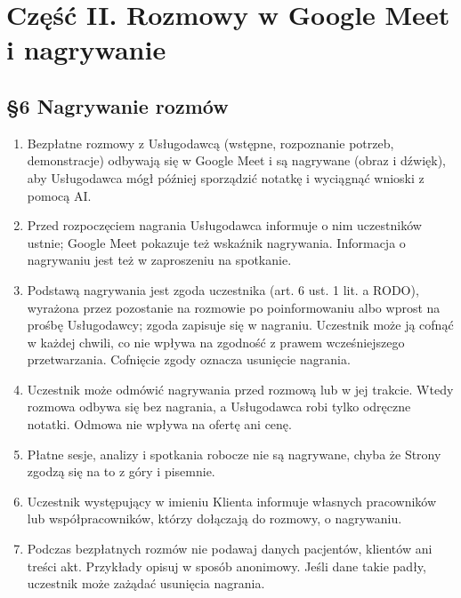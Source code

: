 \documentclass[11pt,a4paper]{article}
\begin{document}
\section*{Część II. Rozmowy w Google Meet i nagrywanie}

\subsection*{§6 Nagrywanie rozmów}
\begin{enumerate}
\item Bezpłatne rozmowy z Usługodawcą (wstępne, rozpoznanie potrzeb, demonstracje) odbywają się w Google Meet i są nagrywane (obraz i dźwięk), aby Usługodawca mógł później sporządzić notatkę i wyciągnąć wnioski z pomocą AI.
\item Przed rozpoczęciem nagrania Usługodawca informuje o nim uczestników ustnie; Google Meet pokazuje też wskaźnik nagrywania. Informacja o nagrywaniu jest też w zaproszeniu na spotkanie.
\item Podstawą nagrywania jest zgoda uczestnika (art. 6 ust. 1 lit. a RODO), wyrażona przez pozostanie na rozmowie po poinformowaniu albo wprost na prośbę Usługodawcy; zgoda zapisuje się w nagraniu. Uczestnik może ją cofnąć w każdej chwili, co nie wpływa na zgodność z prawem wcześniejszego przetwarzania. Cofnięcie zgody oznacza usunięcie nagrania.
\item Uczestnik może odmówić nagrywania przed rozmową lub w jej trakcie. Wtedy rozmowa odbywa się bez nagrania, a Usługodawca robi tylko odręczne notatki. Odmowa nie wpływa na ofertę ani cenę.
\item Płatne sesje, analizy i spotkania robocze nie są nagrywane, chyba że Strony zgodzą się na to z góry i pisemnie.
\item Uczestnik występujący w imieniu Klienta informuje własnych pracowników lub współpracowników, którzy dołączają do rozmowy, o nagrywaniu.
\item Podczas bezpłatnych rozmów nie podawaj danych pacjentów, klientów ani treści akt. Przykłady opisuj w sposób anonimowy. Jeśli dane takie padły, uczestnik może zażądać usunięcia nagrania.
\end{enumerate}
\end{document}
